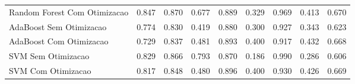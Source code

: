 \begin{table}[H]
\begin{adjustwidth}{ -1in }{ -1in }
\begin{tabular}{lrrrrrrrr}
      Random Forest Com Otimizacao &                        0.847 &                         0.870 &                            0.677 &                            0.889 &                          0.329 &                          0.969 &                                     0.413 &                                 0.670 \\
           AdaBoost Sem Otimizacao &                        0.774 &                         0.830 &                            0.419 &                            0.880 &                          0.300 &                          0.927 &                                     0.343 &                                 0.623 \\
           AdaBoost Com Otimizacao &                        0.729 &                         0.837 &                            0.481 &                            0.893 &                          0.400 &                          0.917 &                                     0.432 &                                 0.668 \\
                SVM Sem Otimizacao &                        0.829 &                         0.866 &                            0.793 &                            0.870 &                          0.186 &                          0.990 &                                     0.286 &                                 0.606 \\
                SVM Com Otimizacao &                        0.817 &                         0.848 &                            0.480 &                            0.896 &                          0.400 &                          0.930 &                                     0.426 &                                 0.669 \\
\bottomrule
\end{tabular}
    \end{adjustwidth}
    \renewcommand{\arraystretch}{1.0} %
\end{table}
